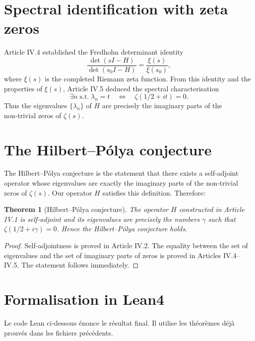 \documentclass[11pt,a4paper]{article}
\newtheorem{theorem}{Theorem}[section]
\begin{document}
\section{Spectral identification with zeta zeros}

Article IV.4 established the Fredholm determinant identity
\[
\frac{\det(sI - H)}{\det(s_0I - H)} = \frac{\xi(s)}{\xi(s_0)},
\]
where $\xi(s)$ is the completed Riemann zeta function. From this identity and the properties of $\xi(s)$, Article IV.5 deduced the spectral characterisation
\[
\exists n\; \text{s.t.}\; \lambda_n = t \quad\Longleftrightarrow\quad \zeta(1/2 + i t) = 0.
\]
Thus the eigenvalues $\{\lambda_n\}$ of $H$ are precisely the imaginary parts of the non‑trivial zeros of $\zeta(s)$.

\section{The Hilbert–Pólya conjecture}

The Hilbert–Pólya conjecture is the statement that there exists a self‑adjoint operator whose eigenvalues are exactly the imaginary parts of the non‑trivial zeros of $\zeta(s)$. Our operator $H$ satisfies this definition. Therefore:

\begin{theorem}[Hilbert–Pólya conjecture]
The operator $H$ constructed in Article IV.1 is self‑adjoint and its eigenvalues are precisely the numbers $\gamma$ such that $\zeta(1/2 + i\gamma)=0$. Hence the Hilbert–Pólya conjecture holds.
\end{theorem}

\begin{proof}
Self‑adjointness is proved in Article IV.2. The equality between the set of eigenvalues and the set of imaginary parts of zeros is proved in Articles IV.4–IV.5. The statement follows immediately.
\end{proof}

\section{Formalisation in Lean4}

Le code Lean ci‑dessous énonce le résultat final. Il utilise les théorèmes déjà prouvés dans les fichiers précédents.
\end{document}
